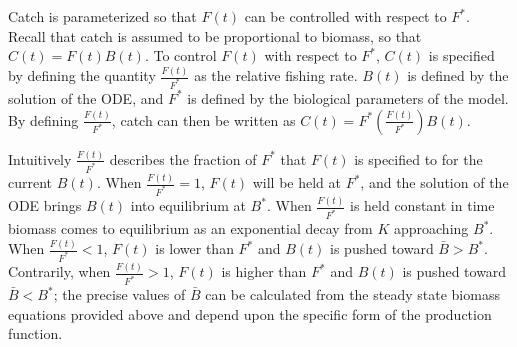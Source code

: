 \documentclass[12pt]{article}
\begin{document}
%
Catch is parameterized so that $F(t)$ can be controlled with respect to $F^*$. 
Recall that catch is assumed to be proportional to biomass, so that $C(t)=F(t)B(t)$.
To control $F(t)$ with respect to $F^*$, $C(t)$ is specified by defining the 
quantity $\frac{F(t)}{F^*}$ as the relative fishing rate. $B(t)$ is defined 
by the solution of the ODE, and $F^*$ is defined by the biological parameters 
of the model. By defining $\frac{F(t)}{F^*}$, catch can then be written as 
\mbox{$C(t)=F^*\left(\frac{F(t)}{F^*}\right)B(t)$.}

%
Intuitively $\frac{F(t)}{F^*}$ describes the fraction of $F^*$ that $F(t)$ is  
specified to for the current $B(t)$. When $\frac{F(t)}{F^*}=1$, $F(t)$ will be 
held at $F^*$, and the solution of the ODE brings $B(t)$ into equilibrium at 
$B^*$. When $\frac{F(t)}{F^*}$ is held constant in time biomass %
comes to equilibrium as an exponential decay from $K$ approaching $B^*$. 
When $\frac{F(t)}{F^*}<1$, $F(t)$ is lower than $F^*$ and $B(t)$ is pushed 
toward $\bar B>B^*$. Contrarily, when $\frac{F(t)}{F^*}>1$, $F(t)$ is higher 
than $F^*$ and $B(t)$ is pushed toward $\bar B<B^*$; the precise values of 
$\bar B$ can be calculated from the steady state biomass equations provided 
above and depend upon the specific form of the production function. %
\end{document}
